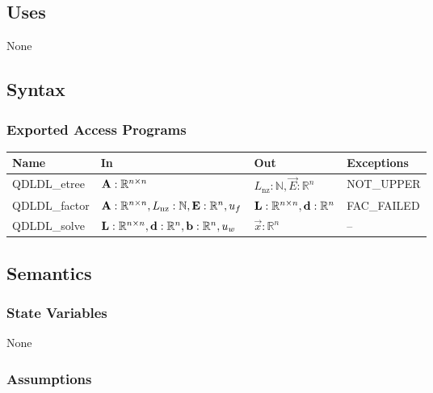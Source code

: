 \documentclass[12pt, titlepage]{article}
\begin{document}
\subsection{Uses}

None

\subsection{Syntax}

\subsubsection{Exported Access Programs}

\begin{center}
  \begin{tabularx}{\linewidth}{%
    p{3cm}
    >{\raggedright\arraybackslash}X
    >{\raggedright\arraybackslash}l
    >{\raggedright\arraybackslash}l
    }
    \hline
    \textbf{Name}       & \textbf{In}                                           & \textbf{Out}                          & \textbf{Exceptions} \\
    \hline
    QDLDL\_etree  & \(\mathbf{A}: \mathbb{R}^{n \times n}\)                         & \(L_\mathrm{nz}: \mathbb{N}, \vec{E}: \mathbb{R}^n\)          & NOT\_UPPER    \\
    QDLDL\_factor & \(\mathbf{A}: \mathbb{R}^{n \times n}, L_\mathrm{nz}: \mathbb{N}, \mathbf{E}: \mathbb{R}^n, u_f\) & \(\mathbf{L}: \mathbb{R}^{n \times n}, \mathbf{d}: \mathbb{R}^n\) & FAC\_FAILED   \\
    QDLDL\_solve  & \(\mathbf{L}: \mathbb{R}^{n \times n}, \mathbf{d}: \mathbb{R}^n, \mathbf{b}: \mathbb{R}^n, u_w\)     & \(\vec{x}: \mathbb{R}^n\)                      & --            \\
    \hline
  \end{tabularx}
\end{center}

\subsection{Semantics}

\subsubsection{State Variables}

None

\subsubsection{Assumptions}
\end{document}
